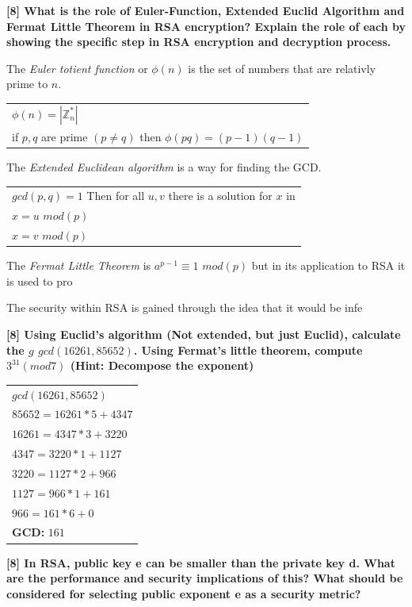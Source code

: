 \documentclass[letterpaper,11pt,notitlepage,fleqn]{article}
\begin{document}
\noindent \textbf{[8]  What  is  the  role  of  Euler-Function,  Extended  Euclid  Algorithm  and  Fermat Little  Theorem  in  RSA  encryption?  Explain  the  role  of  each  by  showing  the specific step in RSA encryption and decryption process.}

The \textit{Euler totient function} or $\phi(n)$ is the set of numbers that are relativly prime to $n$. \\
\begin{center}
    \begin{tabular}{l}
        $\phi(n) = |\mathbb{Z}_{n}^{*}|$ \\
        if $p,q$ are prime $(p \neq q)$ then $\phi(pq) = (p-1)(q-1)$
    \end{tabular}
\end{center}

The \textit{Extended Euclidean algorithm} is a way for finding the GCD.\\
\begin{center}
    \begin{tabular}{l}
        $gcd(p,q) = 1$ Then for all $u,v$ there is a solution for $x$ in \\
        $x = u$ $mod(p)$ \\ 
        $x = v$ $mod(p)$ 
    \end{tabular}
\end{center}
The \textit{Fermat Little Theorem} is $a^{p-1} \equiv 1$ $mod(p)$ but in its application to RSA it is used to pro


The security within RSA is gained through the idea that it would be infe

\noindent \textbf{[8] Using Euclid’s algorithm (Not extended, but just Euclid), calculate the $g$ $gcd(16261,  85652)$.  Using  Fermat’s  little  theorem,  compute  $3^{31}  (mod  7)$  (Hint: Decompose the exponent)} 

\begin{center}
    \begin{tabular}{l}
        $gcd(16261, 85652)$\\
        $85652 = 16261 \ast 5 + 4347$\\
        $16261 = 4347\ast 3 + 3220$ \\
        $4347 = 3220\ast 1 + 1127$ \\
        $3220 = 1127\ast 2 + 966$ \\
        $1127 = 966\ast 1 + 161$ \\
        $966 = 161\ast 6 + 0$ \\
        \textbf{GCD:} $161$\\
    \end{tabular}
\end{center}
\noindent \textbf{[8]  In  RSA,  public  key  e  can  be  smaller  than  the  private  key  d.  What  are  the performance  and  security  implications  of  this?  What  should  be  considered  for selecting public exponent e as a security metric?}
\end{document}
